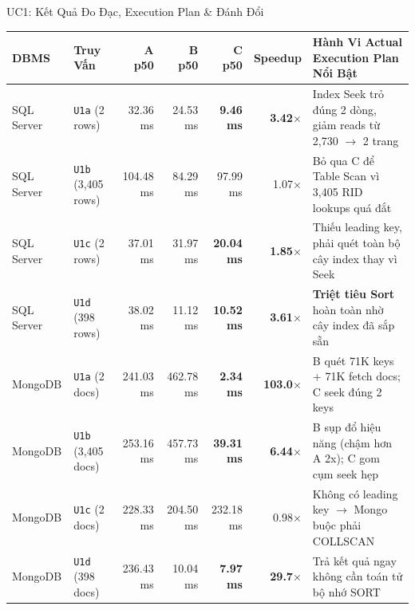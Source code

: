 \documentclass[aspectratio=169,9pt]{beamer}
\begin{document}
\begin{frame}{UC1: Kết Quả Đo Đạc, Execution Plan \& Đánh Đổi}
\begin{table}
\centering\scriptsize
\begin{tabularx}{\linewidth}{@{}l l r r r r X@{}}
\toprule
\textbf{DBMS} & \textbf{Truy Vấn} & \textbf{A p50} & \textbf{B p50} & \textbf{C p50} & \textbf{Speedup} & \textbf{Hành Vi Actual Execution Plan Nổi Bật} \\
\midrule
SQL Server & \texttt{U1a} (2 rows) & 32.36 ms & 24.53 ms & \textbf{9.46 ms} & \textbf{3.42$\times$} & Index Seek trỏ đúng 2 dòng, giảm reads từ 2,730 $\to$ 2 trang \\
SQL Server & \texttt{U1b} (3,405 rows) & 104.48 ms & 84.29 ms & 97.99 ms & 1.07$\times$ & Bỏ qua C để Table Scan vì 3,405 RID lookups quá đắt \\
SQL Server & \texttt{U1c} (2 rows) & 37.01 ms & 31.97 ms & \textbf{20.04 ms} & \textbf{1.85$\times$} & Thiếu leading key, phải quét toàn bộ cây index thay vì Seek \\
SQL Server & \texttt{U1d} (398 rows) & 38.02 ms & 11.12 ms & \textbf{10.52 ms} & \textbf{3.61$\times$} & \textbf{Triệt tiêu Sort} hoàn toàn nhờ cây index đã sắp sẵn \\
\midrule
MongoDB & \texttt{U1a} (2 docs) & 241.03 ms & 462.78 ms & \textbf{2.34 ms} & \textbf{103.0$\times$} & B quét 71K keys + 71K fetch docs; C seek đúng 2 keys \\
MongoDB & \texttt{U1b} (3,405 docs) & 253.16 ms & 457.73 ms & \textbf{39.31 ms} & \textbf{6.44$\times$} & B sụp đổ hiệu năng (chậm hơn A 2x); C gom cụm seek hẹp \\
MongoDB & \texttt{U1c} (2 docs) & 228.33 ms & 204.50 ms & 232.18 ms & 0.98$\times$ & Không có leading key $\to$ Mongo buộc phải COLLSCAN \\
MongoDB & \texttt{U1d} (398 docs) & 236.43 ms & 10.04 ms & \textbf{7.97 ms} & \textbf{29.7$\times$} & Trả kết quả ngay không cần toán tử bộ nhớ SORT \\
\bottomrule
\end{tabularx}
\end{table}


\end{frame}
\end{document}
